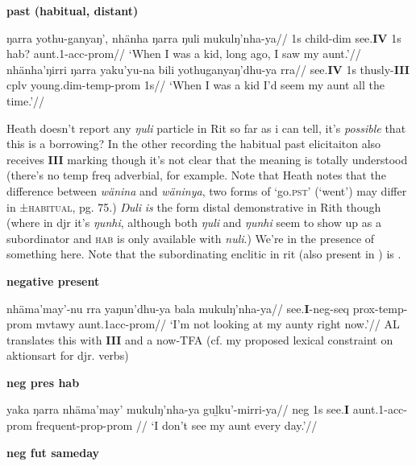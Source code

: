 \pex \textbf{past (habitual, distant)}

\a\begingl\gla ŋarra yothu-ganyaŋ', nhänha ŋarra ŋuli mukulŋ'nha-ya//
\glb 1s child-\gls{dim} see.\textbf{IV} 1s \gls{hab}? aunt.1-\gls{acc}-\gls{prom}//
\glft`When  I was a kid, long ago, I saw my aunt.'\trailingcitation{[RN~20190520~2min15]}//\endgl
\a\begingl
\gla  nhänha'ŋirri ŋarra yaku'yu-na bili yothuganyaŋ'dhu-ya rra//
\glb see.\textbf{IV} 1s thusly-\textbf{III} \gls{cplv} young.\gls{dim}-\gls{temp}-\gls{prom} 1s//
\glft `When I was a kid I'd seem my aunt all the time.'\trailingcitation{[RN~20190520~2min25]}//\endgl
\xe

\begin{framed}\noindent
Heath doesn't report any \textit{ŋuli} particle in Rit so far as i can tell, it's \textit{possible} that this is a borrowing?  In the other recording the habitual past elicitaiton also receives \textbf{III} marking though it's not clear that the meaning is totally understood (there's no temp freq adverbial, for example. Note that Heath notes that the difference between \textit{wänina} and \textit{wäninya}, two forms of `go.\textsc{pst}' (`went') may differ in ±\textsc{habitual}, pg. 75.) \textit{Ŋuli} \textit{is} the form distal demonstrative in Rith though (where in djr it's \textit{ŋunhi}, although both \textit{ŋuli} and \textit{ŋunhi} seem to show up as a subordinator and \textsc{hab }is only available with \textit{nuli}.) We're in the presence of something here. Note that the subordinating enclitic in rit (also present in ) is \textit{}.
\end{framed}
\pex \textbf{negative present}

\a\begingl
\gla  nhäma'may'-nu rra yaŋun'dhu-ya bala mukulŋ'nha-ya//
\glb see.\textbf{I}-\gls{neg}-\gls{seq} \gls{prox}-\gls{temp}-\gls{prom} \gls{mvtawy} aunt.1\gls{acc}-\gls{prom}//
\glft`I'm not looking at my aunty right now.'\trailingcitation{[RN~20190520~2min42]}//\endgl
\a AL translates this with \textbf{III} and a now-TFA (cf. my proposed lexical constraint on aktionsart for djr. verbs)
\xe

\pex\textbf{neg pres hab}

\a\begingl\gla  yaka ŋarra nhäma'may' mukulŋ'nha-ya guḻku'-mirri-ya//
\glb \gls{neg} 1s see.\textbf{I} aunt.1-\gls{acc}-\gls{prom} frequent-\gls{prop}-\gls{prom} //
\glft`I don't see my aunt every day.'\trailingcitation{[RN~20190520~2min54s]}//\endgl\xe


\pex\textbf{neg fut sameday}


